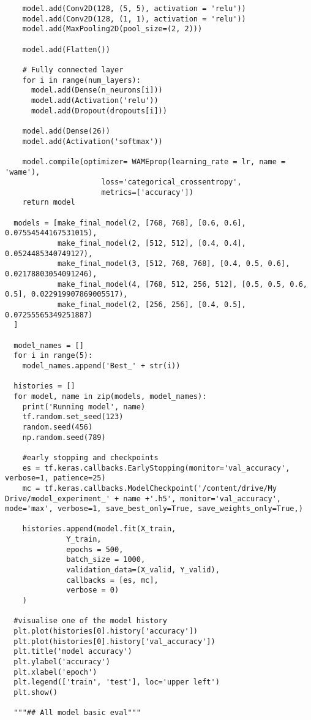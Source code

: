 \documentclass[12pt]{article}
\numberwithin{equation}{section}
\numberwithin{figure}{section}
\numberwithin{table}{section}
\begin{document}
\begin{lstlisting}
    model.add(Conv2D(128, (5, 5), activation = 'relu'))
    model.add(Conv2D(128, (1, 1), activation = 'relu'))
    model.add(MaxPooling2D(pool_size=(2, 2)))
  
    model.add(Flatten())
  
    # Fully connected layer
    for i in range(num_layers):
      model.add(Dense(n_neurons[i]))
      model.add(Activation('relu'))
      model.add(Dropout(dropouts[i]))
  
    model.add(Dense(26))
    model.add(Activation('softmax'))
  
    model.compile(optimizer= WAMEprop(learning_rate = lr, name = 'wame'),
                      loss='categorical_crossentropy',
                      metrics=['accuracy'])
    return model
  
  models = [make_final_model(2, [768, 768], [0.6, 0.6], 0.07554544167531015),
            make_final_model(2, [512, 512], [0.4, 0.4], 0.0524485340749127),
            make_final_model(3, [512, 768, 768], [0.4, 0.5, 0.6], 0.02178803054091246),
            make_final_model(4, [768, 512, 256, 512], [0.5, 0.5, 0.6, 0.5], 0.022919907869005517),
            make_final_model(2, [256, 256], [0.4, 0.5], 0.07255565349251887)
  ]
  
  model_names = []
  for i in range(5):
    model_names.append('Best_' + str(i))
  
  histories = []
  for model, name in zip(models, model_names):
    print('Running model', name)
    tf.random.set_seed(123)
    random.seed(456)
    np.random.seed(789)
  
    #early stopping and checkpoints
    es = tf.keras.callbacks.EarlyStopping(monitor='val_accuracy', verbose=1, patience=25)
    mc = tf.keras.callbacks.ModelCheckpoint('/content/drive/My Drive/model_experiment_' + name +'.h5', monitor='val_accuracy', mode='max', verbose=1, save_best_only=True, save_weights_only=True,)
  
    histories.append(model.fit(X_train,
              Y_train,
              epochs = 500,
              batch_size = 1000,
              validation_data=(X_valid, Y_valid),
              callbacks = [es, mc], 
              verbose = 0)
    )
  
  #visualise one of the model history
  plt.plot(histories[0].history['accuracy'])
  plt.plot(histories[0].history['val_accuracy'])
  plt.title('model accuracy')
  plt.ylabel('accuracy')
  plt.xlabel('epoch')
  plt.legend(['train', 'test'], loc='upper left')
  plt.show()
  
  """## All model basic eval"""
  

\end{lstlisting}
\end{document}
